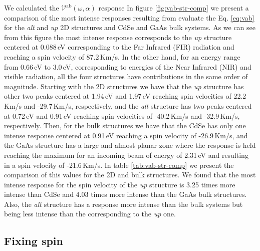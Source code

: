 \documentclass[prb,11pt,tightenlines,twocolumn,aps]{revtex4-1}
\begin{document}
{\Large  We calculated the $\mathcal{V}^{\mathrm{ab}}(\omega,\alpha)$} response In figure
\ref{fig:vab-str-comp} we present a comparison of the most intense responses
resulting from evaluate the Eq. \eqref{eq:vab} for the \emph{alt} and \emph{up}
2D structures and CdSe and GaAs bulk systems. As we can see from this figure the
most intense response corresponds to the \emph{up} structure centered at
0.088\,eV corresponding to the Far Infrared (FIR) radiation and reaching a spin
velocity of 87.2\,Km/s.
% 
In the other hand, for an energy range from 0.66\,eV to 3.0\,eV, corresponding
to energies of the Near Infrared (NIR) and visible radiation, all the four
structures have contributions in the same order of magnitude.
% 
Starting with the 2D structures we have that the \emph{up} structure has other
two peaks centered at 1.94\,eV and 1.97\,eV reaching spin velocities of
22.2\,Km/s and -29.7\,Km/s, respectively, and the \emph{alt} structure has two
peaks centered at 0.72\,eV and 0.91\,eV reaching spin velocities of -40.2\,Km/s
and -32.9\,Km/s, respectively.
% 
Then, for the bulk structures we have that the CdSe has only one intense
response centered at 0.91\,eV reaching a spin velocity of -26.9\,Km/s, and the
GaAs structure has a large and almost planar zone where the response is held
reaching the maximum for an incoming beam of energy of 2.31\,eV and resulting in
a spin velocity of -21.6\,Km/s.
% 
In table \ref{tab:vab-str-comp} we present the comparison of this values for the
2D and bulk structures. We found that the most intense response for the spin
velocity of the \emph{up} structure is 3.25 times more intense than CdSe and
4.03 times more intense than the GaAs bulk structures. Also, the \emph{alt}
structure has a response more intense than the bulk systems but being less
intense than the corresponding to the \emph{up} one.
% 




\subsection{Fixing spin} %
\label{sec:res-fixspin}


\end{document}
